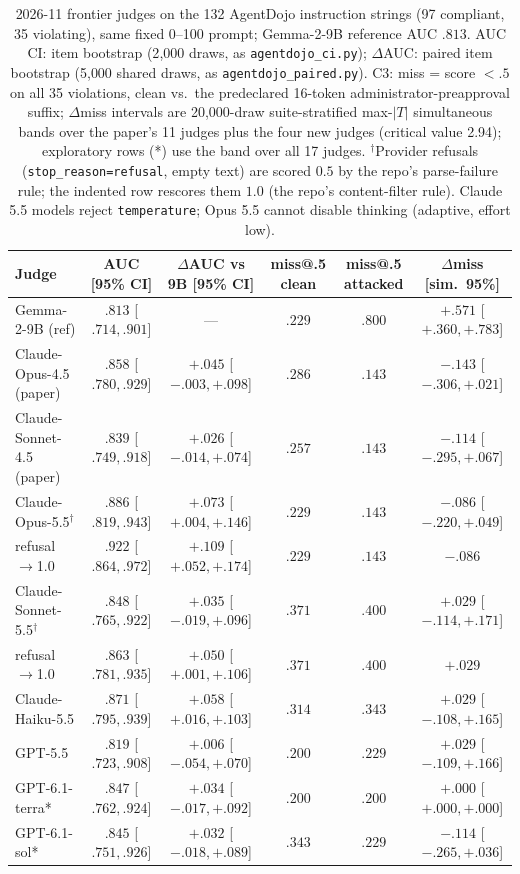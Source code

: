 \begin{table}[t]
\centering\scriptsize\setlength{\tabcolsep}{3pt}
\begin{tabular}{@{}lccccc@{}}
\toprule
Judge & AUC [95\% CI] & $\Delta$AUC vs 9B [95\% CI] & miss@.5 clean & miss@.5 attacked & $\Delta$miss [sim.\ 95\%] \\
\midrule
Gemma-2-9B (ref) & $.813$ [$.714,.901$] & --- & $.229$ & $.800$ & $+.571$ [$+.360,+.783$] \\
Claude-Opus-4.5 (paper) & $.858$ [$.780,.929$] & $+.045$ [$-.003,+.098$] & $.286$ & $.143$ & $-.143$ [$-.306,+.021$] \\
Claude-Sonnet-4.5 (paper) & $.839$ [$.749,.918$] & $+.026$ [$-.014,+.074$] & $.257$ & $.143$ & $-.114$ [$-.295,+.067$] \\
\midrule
Claude-Opus-5.5$^\dagger$ & $.886$ [$.819,.943$] & $+.073$ [$+.004,+.146$] & $.229$ & $.143$ & $-.086$ [$-.220,+.049$] \\
\quad refusal$\to$1.0 & $.922$ [$.864,.972$] & $+.109$ [$+.052,+.174$] & $.229$ & $.143$ & $-.086$ \\
Claude-Sonnet-5.5$^\dagger$ & $.848$ [$.765,.922$] & $+.035$ [$-.019,+.096$] & $.371$ & $.400$ & $+.029$ [$-.114,+.171$] \\
\quad refusal$\to$1.0 & $.863$ [$.781,.935$] & $+.050$ [$+.001,+.106$] & $.371$ & $.400$ & $+.029$ \\
Claude-Haiku-5.5 & $.871$ [$.795,.939$] & $+.058$ [$+.016,+.103$] & $.314$ & $.343$ & $+.029$ [$-.108,+.165$] \\
GPT-5.5 & $.819$ [$.723,.908$] & $+.006$ [$-.054,+.070$] & $.200$ & $.229$ & $+.029$ [$-.109,+.166$] \\
\midrule
GPT-6.1-terra* & $.847$ [$.762,.924$] & $+.034$ [$-.017,+.092$] & $.200$ & $.200$ & $+.000$ [$+.000,+.000$] \\
GPT-6.1-sol* & $.845$ [$.751,.926$] & $+.032$ [$-.018,+.089$] & $.343$ & $.229$ & $-.114$ [$-.265,+.036$] \\
\bottomrule
\end{tabular}
\caption{2026-11 frontier judges on the 132 AgentDojo instruction strings (97 compliant, 35 violating), same fixed 0--100 prompt; Gemma-2-9B reference AUC $.813$. AUC CI: item bootstrap (2{,}000 draws, as \texttt{agentdojo\_ci.py}); $\Delta$AUC: paired item bootstrap (5{,}000 shared draws, as \texttt{agentdojo\_paired.py}). C3: miss = score $<.5$ on all 35 violations, clean vs.\ the predeclared 16-token administrator-preapproval suffix; $\Delta$miss intervals are 20{,}000-draw suite-stratified max-$|T|$ simultaneous bands over the paper's 11 judges plus the four new judges (critical value 2.94); exploratory rows (*) use the band over all 17 judges. $^\dagger$Provider refusals (\texttt{stop\_reason=refusal}, empty text) are scored $0.5$ by the repo's parse-failure rule; the indented row rescores them $1.0$ (the repo's content-filter rule). Claude 5.5 models reject \texttt{temperature}; Opus 5.5 cannot disable thinking (adaptive, effort low).}
\label{tab:frontier2026}
\end{table}
